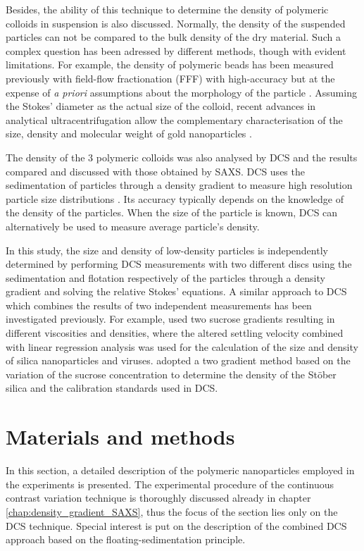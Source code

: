 Besides, the ability of this technique to determine the density of polymeric colloids in suspension is also discussed. Normally, the density of the suspended particles can not be compared to the bulk density of the dry material. Such a complex question has been adressed by different methods, though with evident limitations. For example, the density of polymeric beads has been measured previously with field-flow fractionation (FFF) with high-accuracy but at the expense of \emph{a priori} assumptions about the morphology of the particle \citep{giddings_density_1981,yang_colloid_1983,caldwell_measurement_1986}. Assuming the Stokes' diameter as the actual size of the colloid, recent advances in analytical ultracentrifugation allow the complementary characterisation of the size, density and molecular weight of gold nanoparticles \citep{carney_determination_2011}.

The density of the 3 polymeric colloids was also analysed by DCS and the results compared and discussed with those obtained by SAXS. DCS uses the sedimentation of particles through a density gradient to measure high resolution particle size distributions \citep{minelli_characterization_2014}. Its accuracy typically depends on the knowledge of the density of the particles. When the size of the particle is known, DCS can alternatively be used to measure average particle's density.

In this study, the size and density of low-density particles is independently determined by performing DCS measurements with two different discs using the sedimentation and flotation respectively of the particles through a density gradient and solving the relative Stokes' equations. A similar approach to DCS which combines the results of two independent measurements has been investigated previously. For example, \cite{neumann_new_2013} used two sucrose gradients resulting in different viscosities and densities, where the altered settling velocity combined with linear regression analysis was used for the calculation of the size and density of silica nanoparticles and viruses. \cite{bell_emerging_2012} adopted a two gradient method based on the variation of the sucrose concentration to determine the density of the St\"ober silica and the calibration standards used in DCS.

\section{Materials and methods}
In this section, a detailed description of the polymeric nanoparticles employed in the experiments is presented. The experimental procedure of the continuous contrast variation technique is thoroughly discussed already in chapter \ref{chap:density_gradient_SAXS}, thus the focus of the section lies only on the DCS technique. Special interest is put on the description of the combined DCS approach based on the floating-sedimentation principle.


